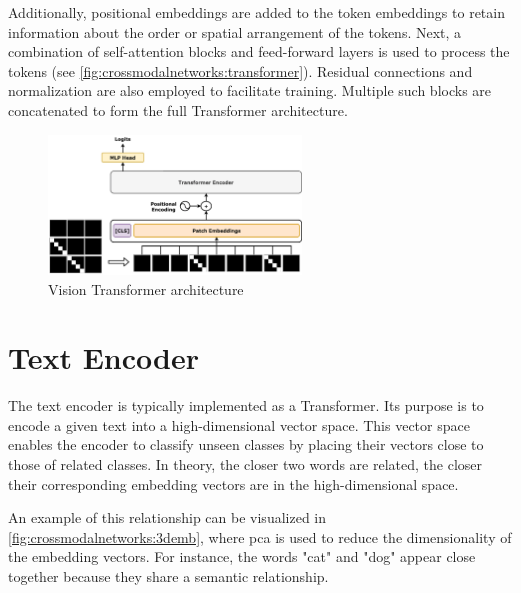     Additionally, positional embeddings are added to the token embeddings to retain information about the order or spatial arrangement of the tokens. 
    Next, a combination of self-attention blocks and feed-forward layers is used to process the tokens (see \cref{fig:crossmodalnetworks:transformer}). 
    Residual connections and normalization are also employed to facilitate training.
    Multiple such blocks are concatenated to form the full Transformer architecture.

    \begin{figure}[]
        \centering
        \includegraphics[width=0.6\textwidth]{Images/crossmodalnetworks/Vision_Transformer.png}
        \caption{Vision Transformer architecture\cite{vitwikipedia}}
        \label{fig:crossmodalnetworks:visiontransformer}
    \end{figure}

    \section{Text Encoder}

    The text encoder is typically implemented as a Transformer. 
    Its purpose is to encode a given text into a high-dimensional vector space. 
    This vector space enables the encoder to classify unseen classes by placing their vectors close to those of related classes. 
    In theory, the closer two words are related, the closer their corresponding embedding vectors are in the high-dimensional space.

    An example of this relationship can be visualized in \cref{fig:crossmodalnetworks:3demb}, where \acrfull{pca} is used to reduce the dimensionality of the embedding vectors. 
    For instance, the words "cat" and "dog" appear close together because they share a semantic relationship.

